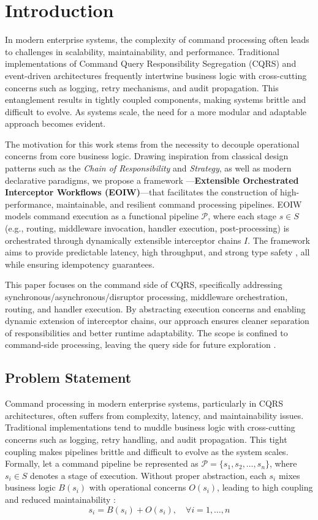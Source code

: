 \section{Introduction}

In modern enterprise systems, the complexity of command processing often leads to challenges in scalability, maintainability, and performance. Traditional implementations of Command Query Responsibility Segregation (CQRS)  and event-driven architectures frequently intertwine business logic with cross-cutting concerns such as logging, retry mechanisms, and audit propagation. This entanglement results in tightly coupled components, making systems brittle and difficult to evolve. As systems scale, the need for a more modular and adaptable approach becomes evident.

The motivation for this work stems from the necessity to decouple operational concerns from core business logic. Drawing inspiration from classical design patterns such as the \textit{Chain of Responsibility} and \textit{Strategy}, as well as modern declarative paradigms, we propose a framework  —\textbf{Extensible Orchestrated Interceptor Workflows (EOIW)}—that facilitates the construction of high-performance, maintainable, and resilient command processing pipelines. EOIW models command execution as a functional pipeline $\mathcal{P}$, where each stage $s \in S$ (e.g., routing, middleware invocation, handler execution, post-processing) is orchestrated through dynamically extensible interceptor chains $I$. The framework aims to provide predictable latency, high throughput, and strong type safety , all while ensuring idempotency guarantees.

This paper focuses on the command side of CQRS, specifically addressing synchronous/asynchronous/disruptor processing, middleware orchestration, routing, and handler execution. By abstracting execution concerns and enabling dynamic extension of interceptor chains, our approach ensures cleaner separation of responsibilities and better runtime adaptability. The scope is confined to command-side processing, leaving the query side for future exploration .

\subsection{Problem Statement}
Command processing in modern enterprise systems, particularly in CQRS architectures, often suffers from complexity, latency, and maintainability issues. Traditional implementations tend to muddle business logic with cross-cutting concerns such as logging, retry handling, and audit propagation. This tight coupling makes pipelines brittle and difficult to evolve as the system scales. Formally, let a command pipeline be represented as $\mathcal{P} = \{s_1, s_2, \dots, s_n\}$, where $s_i \in S$ denotes a stage of execution. Without proper abstraction, each $s_i$ mixes business logic $B(s_i)$ with operational concerns $O(s_i)$, leading to high coupling and reduced maintainability :
\[
s_i = B(s_i) + O(s_i), \quad \forall i = 1, \dots, n
\]

